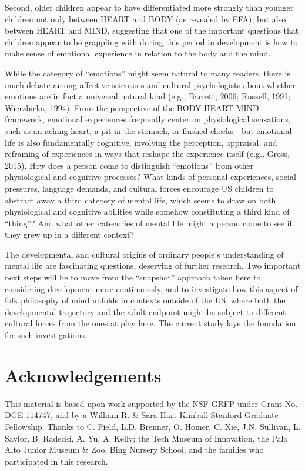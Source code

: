 \documentclass[10pt, letterpaper]{article}
\begin{document}
Second, older children appear to have differentiated more strongly than
younger children not only between HEART and BODY (as revealed by EFA),
but also between HEART and MIND, suggesting that one of the important
questions that children appear to be grappling with during this period
in development is how to make sense of emotional experience in relation
to the body and the mind.

While the category of ``emotions'' might seem natural to many readers,
there is much debate among affective scientists and cultural
psychologists about whether emotions are in fact a universal natural
kind (e.g., Barrett, 2006; Russell, 1991; Wierzbicka, 1994). From the
perspective of the BODY-HEART-MIND framework, emotional experiences
frequently center on physiological sensations, such as an aching heart,
a pit in the stomach, or flushed cheeks---but emotional life is also
fundamentally cognitive, involving the perception, appraisal, and
reframing of experiences in ways that reshape the experience itself
(e.g., Gross, 2015). How does a person come to distinguish ``emotions''
from other physiological and cognitive processes? What kinds of personal
experiences, social pressures, language demands, and cultural forces
encourage US children to abstract away a third category of mental life,
which seems to draw on both physiological and cognitive abilities while
somehow constituting a third kind of ``thing''? And what other
categories of mental life might a person come to see if they grew up in
a different context?

The developmental and cultural origins of ordinary people's
understanding of mental life are fascinating questions, deserving of
further research. Two important next steps will be to move from the
``snapshot'' approach taken here to considering development more
continuously, and to investigate how this aspect of folk philosophy of
mind unfolds in contexts outside of the US, where both the developmental
trajectory and the adult endpoint might be subject to different cultural
forces from the ones at play here. The current study lays the foundation
for such investigations.

\section{Acknowledgements}\label{acknowledgements}

This material is based upon work supported by the NSF GRFP under Grant
No. DGE-114747, and by a William R. \& Sara Hart Kimball Stanford
Graduate Fellowship. Thanks to C. Field, L.D. Brenner, O. Homer, C. Xie,
J.N. Sullivan, L. Saylor, B. Radecki, A. Yu, A. Kelly; the Tech Museum
of Innovation, the Palo Alto Junior Museum \& Zoo, Bing Nursery School;
and the families who participated in this research.
\end{document}
